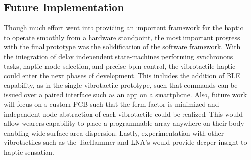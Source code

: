 \subsection{Future Implementation}
Though much effort went into providing an important framework for the haptic to operate smoothly from a hardware standpoint, the most important progress with the final prototype was the solidification of the software framework. With the integration of delay independent state-machines performing synchronous tasks, haptic mode selection, and precise bpm control, the vibrotactile haptic could enter the next phases of development. This includes the addition of BLE capability, as in the single vibrotactile prototype, such that commands can be issued over a paired interface such as an app on a smartphone. Also, future work will focus on a custom PCB such that the form factor is minimized and independent node abstraction of each vibrotactile could be realized. This would allow wearers capability to place a programmable array anywhere on their body enabling wide surface area dispersion. Lastly, experimentation with other vibrotactiles such as the TacHammer and LNA's would provide deeper insight to haptic sensation.
